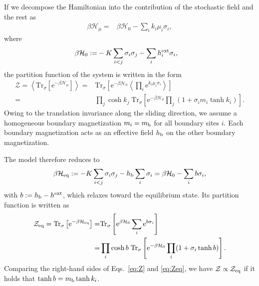 If we decompose the Hamiltonian into the contribution of the stochastic field and the rest as
\begin{align}
\beta \mathcal{H}_{\mu}=&\beta \mathcal{H}_{0} - \sum_{i}k_{i}\mu_{i}\sigma_{i},
\end{align}
where
\begin{align}
\beta \mathcal{H}_{0}:=&-K\sum_{i<j}\sigma_{i}\sigma_{j}-\sum_{i}h^{\rm ext}_{i}\sigma_{i},
\end{align}
the partition function of the system is written in the form
\begin{align}
\mathcal{Z} = \left\langle\mathrm{Tr}_{\sigma}\left[\mathrm{e}^{-\beta \mathcal{H}_{\mu}}\right]\right\rangle =&\mathrm{Tr}_{\sigma}\left[\mathrm{e}^{-\beta \mathcal{H}_{0}}\left\langle\prod_{i}\mathrm{e}^{k_{i}\mu_{i}\sigma_{i}}\right\rangle\right]\\
=&\prod_{j}\cosh k_{j}\;\mathrm{Tr}_{\sigma}\left[\mathrm{e}^{-\beta \mathcal{H}_{0}}\prod_{j}(1+\sigma_{i}m_{i}\tanh k_{i})\right].\label{eq:Z}
\end{align}
Owing to the translation invariance along the sliding direction, we assume a homogeneous boundary magnetization $m_{i}=m_{\rm b}$ for all boundary sites $i$. Each boundary magnetization acts as an effective field $h_{\rm b}$ on the other boundary magnetization. 

The model therefore reduces to
\begin{align}
\beta\mathcal{H}_{\rm eq}:=-K\sum_{i<j}\sigma_{i}\sigma_{j}-h_{\rm b}\sum_{i}\sigma_{i}=\beta\mathcal{H}_{0} - \sum_{i}b\sigma_{i},
\end{align}
with $b:=h_{\rm b}-h^{\rm ext}$, which relaxes toward the equilibrium state. Its partition function is written as
\begin{align}
\mathcal{Z}_{\rm eq}=\mathrm{Tr}_{\sigma}\left[\mathrm{e}^{-\beta\mathcal{H}_{\rm eq}}\right]=&\mathrm{Tr}_{\sigma}\left[\mathrm{e}^{\beta \mathcal{H}_{0}}\sum_{i}\mathrm{e}^{b\sigma_{i}}\right]\\
=&\prod_{i}\cosh b\;\mathrm{Tr}_{\sigma}\left[\mathrm{e}^{-\beta\mathcal{H}_{0}}\prod_{i}(1+\sigma_{i}\tanh b)\right].\label{eq:Zeq}
\end{align}
Comparing the right-hand sides of Eqs.~\eqref{eq:Z} and \eqref{eq:Zeq}, we have $\mathcal{Z} \propto\mathcal{Z}_{\rm eq}$ if it holds that $\tanh b=m_{\rm b}\tanh k_{i}$.

